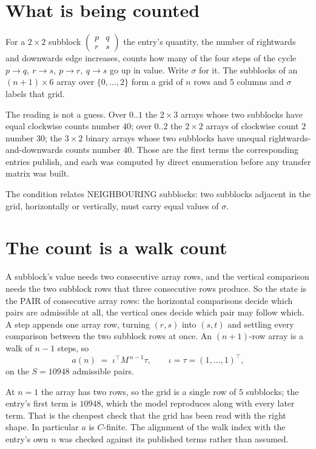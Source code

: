 \documentclass[11pt,a4paper]{article}
\theoremstyle{plain}
\theoremstyle{definition}
\begin{document}
\section{What is being counted}

For a $2\times2$ subblock $\begin{pmatrix}p&q\\r&s\end{pmatrix}$ the
entry's quantity, the number of rightwards and downwards edge increases, counts how many of the four steps of the cycle $p\to q,\ r\to s,\ p\to r,\ q\to s$ go up in value. Write $\sigma$ for it. The subblocks of an
$(n+1)\times6$ array over $\{0,\dots,2\}$ form a grid of $n$ rows and $5$
columns and $\sigma$ labels that grid.

The reading is not a guess. Over $0..1$ the $2\times3$ arrays whose two subblocks have equal
clockwise counts number $40$; over $0..2$ the $2\times2$ arrays of clockwise count $2$ number
$30$; the $3\times2$ binary arrays whose two subblocks have unequal rightwards-and-downwards
counts number $40$. Those are the first terms the corresponding entries publish, and each was
computed by direct enumeration before any transfer matrix was built.

The condition relates NEIGHBOURING subblocks: two subblocks adjacent in the grid, horizontally
or vertically, must carry equal values of $\sigma$.

\section{The count is a walk count}

A subblock's value needs two consecutive array rows, and the vertical
comparison needs the two subblock rows that three consecutive rows produce. So the state is the
PAIR of consecutive array rows: the horizontal comparisons decide which pairs are admissible at
all, the vertical ones decide which pair may follow which. A step appends one array row,
turning $(r,s)$ into $(s,t)$ and settling every comparison between the two subblock rows at
once. An $(n+1)$-row array is a walk of $n-1$ steps, so
\[
a(n)\;=\;\iota^{\!\top}M^{\,n-1}\tau,\qquad\iota=\tau=(1,\dots,1)^{\!\top},
\]
on the $S=10948$ admissible pairs.

At $n=1$ the array has two rows, so the grid is a single row of $5$
subblocks; the entry's first term is $10948$, which the model
reproduces along with every later term. That is the cheapest check that the grid has been read
with the right shape.
In particular $a$ is $C$-finite. The alignment of the walk index with the entry's own $n$ was
checked against its published terms rather than assumed.
\end{document}
